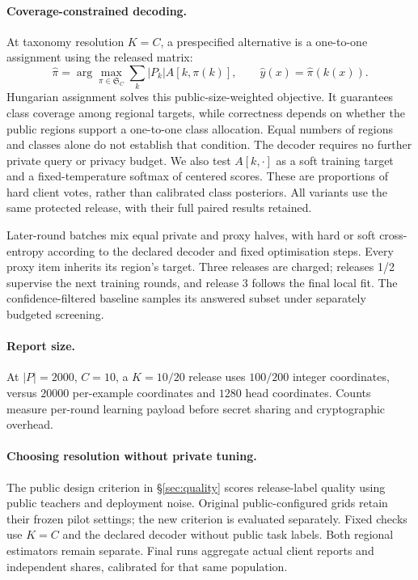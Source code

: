 \paragraph{Coverage-constrained decoding.}
At taxonomy resolution $K=C$, a prespecified alternative is a one-to-one
assignment using the released matrix:
\begin{equation}
\hat\pi=\arg\max_{\pi\in\mathfrak S_C}\sum_k |P_k|A[k,\pi(k)],
\qquad \hat y(x)=\hat\pi(k(x)).
\label{eq:matching}
\end{equation}
Hungarian assignment solves this public-size-weighted objective. It guarantees
class coverage among regional targets, while correctness depends on whether
the public regions support a one-to-one class allocation. Equal numbers of
regions and classes alone do not establish that condition.
The decoder requires no further private query or privacy budget.
We also test $A[k,\cdot]$ as a soft training target and a fixed-temperature
softmax of centered scores. These are proportions of hard client votes,
rather than calibrated class posteriors. All variants use the same protected
release, with their full paired results retained.

Later-round batches mix equal private and proxy halves, with hard or soft
cross-entropy according to the declared decoder and fixed optimisation steps.
Every proxy item inherits its region's target. Three releases are charged;
releases 1/2 supervise the next training rounds, and release 3 follows the
final local fit. The confidence-filtered baseline samples its answered subset
under separately budgeted screening.

\paragraph{Report size.}
At $|P|=2000$, $C=10$, a $K=10/20$ release uses $100/200$ integer
coordinates, versus $20000$ per-example coordinates and $1280$ head coordinates.
Counts measure per-round learning payload before secret sharing and
cryptographic overhead.

\paragraph{Choosing resolution without private tuning.}
The public design criterion in \S\ref{sec:quality} scores release-label quality
using public teachers and deployment noise. Original public-configured grids
retain their frozen pilot settings; the new criterion is evaluated separately.
Fixed checks use $K=C$ and the declared decoder without public task labels.
Both regional estimators remain separate. Final runs aggregate actual client
reports and independent shares, calibrated for that same population.

